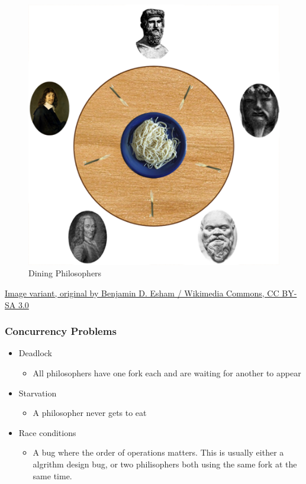 \begin{figure}[htbp]
\centering
\includegraphics{04HPC/figures/diningphilosophers.png}
\caption{Dining Philosophers}
\end{figure}

\href{https://commons.wikimedia.org/w/index.php?curid=56559}{Image
variant, original by Benjamin D. Esham / Wikimedia Commons, CC BY-SA
3.0}

\subsubsection{Concurrency Problems}\label{concurrency-problems}

\begin{itemize}
\itemsep1pt\parskip0pt
\item
  Deadlock

  \begin{itemize}
  \itemsep1pt\parskip0pt
  \item
    All philosophers have one fork each and are waiting for another to
    appear
  \end{itemize}
\item
  Starvation

  \begin{itemize}
  \itemsep1pt\parskip0pt
  \item
    A philosopher never gets to eat
  \end{itemize}
\item
  Race conditions

  \begin{itemize}
  \itemsep1pt\parskip0pt
  \item
    A bug where the order of operations matters. This is usually either
    a algrithm design bug, or two philisophers both using the same fork
    at the same time.
  \end{itemize}
\end{itemize}

